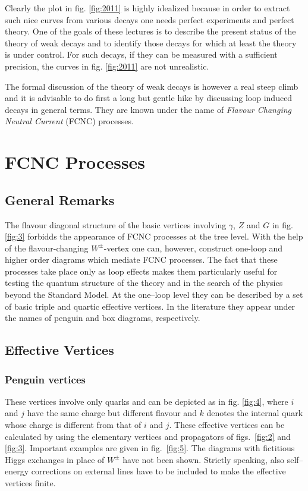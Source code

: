 \documentclass[12pt,rotate]{article}
\begin{document}
\begin{itemize}
Clearly the plot in fig. \ref{fig:2011} is highly idealized because in order
to extract such nice curves from various decays one needs perfect
experiments and perfect theory. 
One of the goals of these lectures is to describe the present status
of the theory of weak decays and to identify those decays
for which at least the theory is under control. For such decays,
if they can be measured with a sufficient precision, the curves
in fig. \ref{fig:2011} are  not unrealistic.

The formal discussion of the theory of weak decays is however a real
steep climb and it is advisable to do first a long but gentle hike
by discussing loop induced decays in general terms.
They are known under the name of
{\it Flavour Changing Neutral Current} (FCNC) processes.

\section{FCNC Processes}
\setcounter{equation}{0}
\subsection{General Remarks}
The flavour diagonal structure of the basic vertices involving $\gamma$,
$Z$ and $G$ in fig. \ref{fig:3} 
forbidds the appearance of FCNC processes at the
tree level. With the help of the flavour-changing $W^\pm$-vertex one
can, however, construct one-loop and higher order diagrams which mediate
FCNC processes. The fact that these processes take place only as loop
effects makes them particularly useful for testing the quantum structure
of the theory and in the search of the physics beyond the Standard Model.
At the one--loop level
they can be described by a set
of basic triple and quartic effective vertices. In the literature they
appear under the names of penguin and box diagrams, respectively.
\subsection{Effective Vertices}
\subsubsection{Penguin vertices}
\noindent
These vertices involve only quarks and can be depicted as in 
fig. \ref{fig:4},
where $i$ and $j$ have the same charge but different flavour and $k$
denotes the internal quark whose charge is different from that of $i$
and $j$. 
These effective vertices 
can be calculated by using the elementary vertices and 
propagators of figs.~\ref{fig:2} and \ref{fig:3}.
Important examples are given in fig.~\ref{fig:5}.
The diagrams with fictitious Higgs exchanges in place of $W^\pm$ have 
not been
shown. Strictly
speaking, also self--energy corrections on external lines have to be
included to make the effective vertices finite.

\end{itemize}
\end{document}

